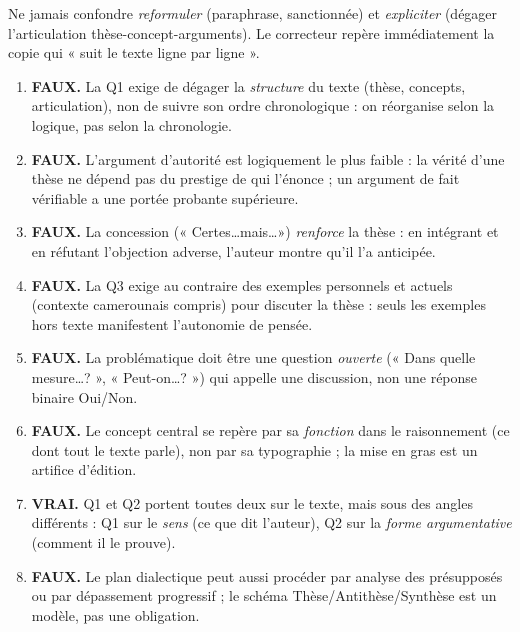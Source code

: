 \documentclass[11pt]{article}
\begin{document}
\begin{attention}
Ne jamais confondre \emph{reformuler} (paraphrase, sanctionnée) et \emph{expliciter} (dégager l'articulation thèse-concept-arguments). Le correcteur repère immédiatement la copie qui « suit le texte ligne par ligne ».
\end{attention}

\begin{corrige}
\begin{enumerate}
    \item \textbf{FAUX.} La Q1 exige de dégager la \emph{structure} du texte (thèse, concepts, articulation), non de suivre son ordre chronologique : on réorganise selon la logique, pas selon la chronologie.
    \item \textbf{FAUX.} L'argument d'autorité est logiquement le plus faible : la vérité d'une thèse ne dépend pas du prestige de qui l'énonce ; un argument de fait vérifiable a une portée probante supérieure.
    \item \textbf{FAUX.} La concession (« Certes\dots mais\dots ») \emph{renforce} la thèse : en intégrant et en réfutant l'objection adverse, l'auteur montre qu'il l'a anticipée.
    \item \textbf{FAUX.} La Q3 exige au contraire des exemples personnels et actuels (contexte camerounais compris) pour discuter la thèse : seuls les exemples hors texte manifestent l'autonomie de pensée.
    \item \textbf{FAUX.} La problématique doit être une question \emph{ouverte} (« Dans quelle mesure\dots ? », « Peut-on\dots ? ») qui appelle une discussion, non une réponse binaire Oui/Non.
    \item \textbf{FAUX.} Le concept central se repère par sa \emph{fonction} dans le raisonnement (ce dont tout le texte parle), non par sa typographie ; la mise en gras est un artifice d'édition.
    \item \textbf{VRAI.} Q1 et Q2 portent toutes deux sur le texte, mais sous des angles différents : Q1 sur le \emph{sens} (ce que dit l'auteur), Q2 sur la \emph{forme argumentative} (comment il le prouve).
    \item \textbf{FAUX.} Le plan dialectique peut aussi procéder par analyse des présupposés ou par dépassement progressif ; le schéma Thèse/Antithèse/Synthèse est un modèle, pas une obligation.
\end{enumerate}
\end{corrige}
\end{document}
